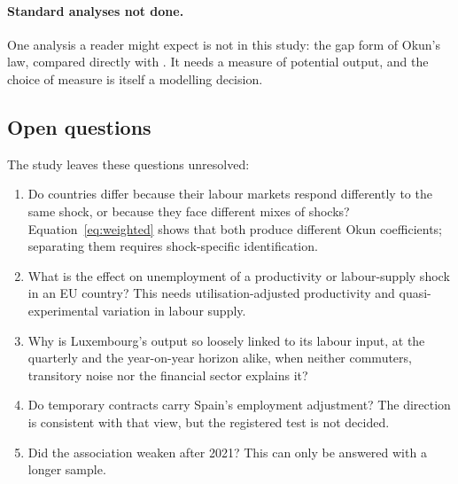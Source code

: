 \paragraph{Standard analyses not done.} One analysis a reader might expect is not in this
study: the gap form of Okun's law, compared directly with \citet{ball2017okun}. It needs a
measure of potential output, and the choice of measure is itself a modelling decision.

\subsection{Open questions}

The study leaves these questions unresolved:
\begin{enumerate}
  \item Do countries differ because their labour markets respond differently to the same
    shock, or because they face different mixes of shocks?
    Equation~\eqref{eq:weighted} shows that both produce different Okun coefficients;
    separating them requires shock-specific identification.
  \item What is the effect on unemployment of a productivity or labour-supply shock in an
    EU country? This needs utilisation-adjusted productivity and quasi-experimental
    variation in labour supply.
  \item Why is Luxembourg's output so loosely linked to its labour input, at the quarterly
    and the year-on-year horizon alike, when neither commuters, transitory noise nor the
    financial sector explains it?
  \item Do temporary contracts carry Spain's employment adjustment? The direction is
    consistent with that view, but the registered test is not decided.
  \item Did the association weaken after 2021? This can only be answered with a longer
    sample.
\end{enumerate}
